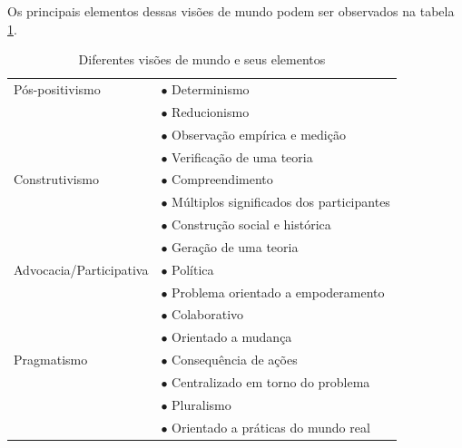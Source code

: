 Os principais elementos dessas visões de mundo podem ser observados na tabela \ref{tab:visoes_mundo}.

    \begin{center}
        \begin{table}[!htp]
            \caption{Diferentes visões de mundo e seus elementos}
            \label{tab:visoes_mundo}
            \begin{tabular}{|p{4.5cm}|p{10cm}|}
                \cline{1-2}                                 
                \hline
                {Pós-positivismo}                        &$\bullet$ Determinismo                             \\
                                                         &$\bullet$ Reducionismo                             \\
                                                         &$\bullet$ Observação empírica e medição            \\
                                                         &$\bullet$ Verificação de uma teoria                \\
                \hline
                {Construtivismo}                         &$\bullet$ Compreendimento                          \\
                                                         &$\bullet$ Múltiplos significados dos participantes \\
                                                         &$\bullet$ Construção social e histórica            \\
                                                         &$\bullet$ Geração de uma teoria                    \\
                \hline
                {Advocacia/Participativa}                &$\bullet$ Política                                 \\
                                                         &$\bullet$ Problema orientado a empoderamento       \\
                                                         &$\bullet$ Colaborativo                             \\
                                                         &$\bullet$ Orientado a mudança                      \\
                \hline
                {Pragmatismo}                            &$\bullet$ Consequência de ações                    \\
                                                         &$\bullet$ Centralizado em torno do problema        \\
                                                         &$\bullet$ Pluralismo                               \\
                                                         &$\bullet$ Orientado a práticas do mundo real       \\
                \hline
            \end{tabular}
        \end{table}
    \end{center}

